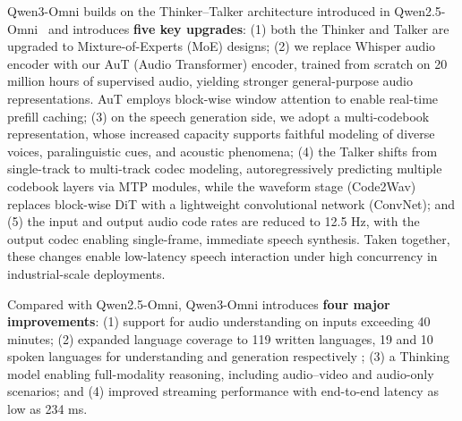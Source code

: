 Qwen3-Omni builds on the Thinker–Talker architecture introduced in Qwen2.5-Omni~\citep{qwen2.5omni} and introduces \textbf{five key upgrades}: (1) both the Thinker and Talker are upgraded to Mixture-of-Experts (MoE) designs; (2) we replace Whisper audio encoder with our AuT (Audio Transformer) encoder, trained from scratch on 20 million hours of supervised audio, yielding stronger general-purpose audio representations. AuT employs block-wise window attention to enable real-time prefill caching; (3) on the speech generation side, we adopt a multi-codebook representation,
whose increased capacity supports faithful modeling of diverse voices, paralinguistic cues, and acoustic phenomena; (4) the Talker shifts from single-track to multi-track codec modeling, autoregressively predicting multiple codebook layers via MTP modules, while the waveform stage (Code2Wav) replaces block-wise DiT with a lightweight convolutional network (ConvNet); and (5) the input and output audio code rates are reduced to 12.5 Hz, with the output codec enabling single-frame, immediate speech synthesis. Taken together, these changes enable low-latency speech interaction under high concurrency in industrial-scale deployments.

Compared with Qwen2.5-Omni, Qwen3-Omni introduces \textbf{four major improvements}: (1) support for audio understanding on inputs exceeding 40 minutes; (2) expanded language coverage to 119 written languages, 19 and 10 spoken languages for understanding and generation respectively ; (3) a Thinking model enabling full-modality reasoning, including audio–video and audio-only scenarios; and (4) improved streaming performance with end-to-end latency as low as 234 ms.

    
    
